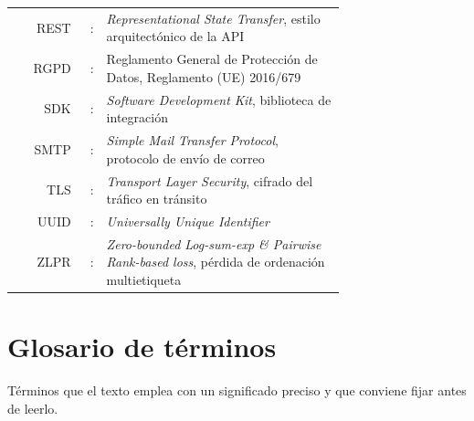 \begin{longtable}{r r p{0.72\linewidth}}
REST  & : & \emph{Representational State Transfer}, estilo arquitectónico de la API \\
RGPD  & : & Reglamento General de Protección de Datos, Reglamento (UE) 2016/679 \\
SDK   & : & \emph{Software Development Kit}, biblioteca de integración \\
SMTP  & : & \emph{Simple Mail Transfer Protocol}, protocolo de envío de correo \\
TLS   & : & \emph{Transport Layer Security}, cifrado del tráfico en tránsito \\
UUID  & : & \emph{Universally Unique Identifier} \\
ZLPR  & : & \emph{Zero-bounded Log-sum-exp \& Pairwise Rank-based loss}, pérdida de ordenación multietiqueta \\
\end{longtable}


\clearpage
\section*{Glosario de términos}

Términos que el texto emplea con un significado preciso y que conviene fijar antes de leerlo.

